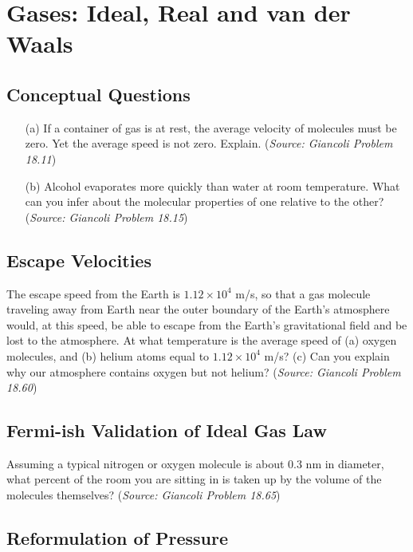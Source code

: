 \documentclass{article}
\begin{document}
\section{Gases: Ideal, Real and van der Waals}

\subsection{Conceptual Questions}

\begin{itemize}
	\item[(a)] If a container of gas is at rest, the average velocity of molecules must be zero. Yet the average speed is not zero. Explain. (\textit{Source: Giancoli Problem 18.11})
	\item[(b)] Alcohol evaporates more quickly than water at room temperature. What can you infer about the molecular properties of one relative to the other? (\textit{Source: Giancoli Problem 18.15})
\end{itemize}

\subsection{Escape Velocities}

The escape speed from the Earth is $1.12\times10^4$ m/s, so that a gas molecule traveling away from Earth near the outer boundary of the Earth's atmosphere would, at this speed, be able to escape from the Earth's gravitational field and be lost to the atmosphere. At what temperature is the average speed of (a) oxygen molecules, and (b) helium atoms equal to $1.12\times10^4$ m/s? (c) Can you explain why our atmosphere contains oxygen but not helium? (\textit{Source: Giancoli Problem 18.60})

\subsection{Fermi-ish Validation of Ideal Gas Law}

Assuming a typical nitrogen or oxygen molecule is about $0.3$ nm in diameter, what percent of the room you are sitting in is taken up by the volume of the molecules themselves? (\textit{Source: Giancoli Problem 18.65})

\subsection{Reformulation of Pressure}
\end{document}

